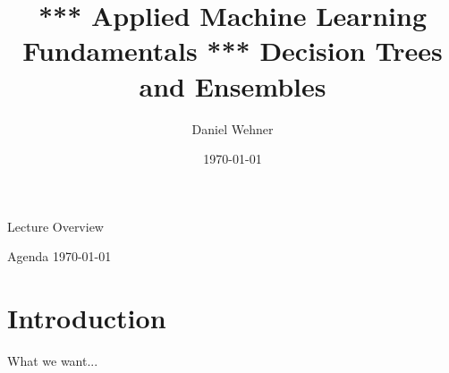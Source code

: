 


\title[Decision Trees and Ensembles]{*** Applied Machine Learning Fundamentals *** Decision Trees and Ensembles}
\author{Daniel Wehner}
\date{\today}




\maketitlepage


\begin{frame}{Lecture Overview}{}
\end{frame}


\begin{frame}{Agenda \today}
	\begin{multicols}{2}
		\tableofcontents
	\end{multicols}
\end{frame}


\section{Introduction}

\begin{frame}{What we want...}{}
\end{frame}



